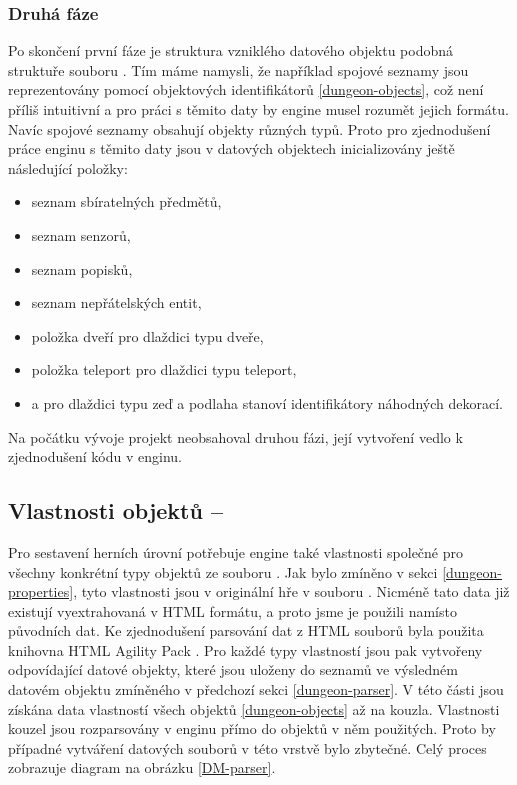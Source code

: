 \subsubsection{Druhá fáze}
Po skončení první fáze je struktura vzniklého datového objektu podobná struktuře souboru . Tím máme namysli, že
například spojové seznamy jsou reprezentovány pomocí objektových identifikátorů \vref{dungeon-objects}, což není příliš intuitivní a pro práci 
s těmito daty by engine musel rozumět jejich formátu. Navíc spojové seznamy obsahují objekty různých typů. Proto pro zjednodušení práce enginu
s těmito daty jsou v datových objektech inicializovány ještě následující položky: 
\begin{itemize} 
\item seznam sbíratelných předmětů,
\item seznam senzorů,
\item seznam popisků,
\item seznam nepřátelských entit,
\item položka dveří pro dlaždici typu dveře,
\item položka teleport pro dlaždici typu teleport,
\item a pro dlaždici typu zeď a podlaha stanoví identifikátory náhodných dekorací.
\end{itemize} 

Na počátku vývoje projekt neobsahoval druhou fázi, její vytvoření vedlo k zjednodušení kódu v enginu.

\subsection{Vlastnosti objektů -- }

Pro sestavení herních úrovní potřebuje engine také vlastnosti společné pro všechny konkrétní typy objektů ze
souboru . Jak bylo zmíněno v sekci \ref{dungeon-properties}, tyto vlastnosti jsou v originální hře v souboru .
Nicméně tato data již existují vyextrahovaná v HTML formátu, a proto jsme je použili namísto původních dat.
Ke zjednodušení parsování dat z HTML souborů byla
použita knihovna HTML Agility Pack \cite{HtmlAgilityPack}. Pro každé typy vlastností jsou pak vytvořeny odpovídající datové objekty,
které jsou uloženy do seznamů ve výsledném datovém objektu zmíněného v předchozí
sekci \ref{dungeon-parser}. V této části jsou získána data vlastností všech objektů \vref{dungeon-objects} až na kouzla.
Vlastnosti kouzel jsou rozparsovány v enginu přímo do objektů v něm použitých. Proto by případné vytváření datových souborů
v této vrstvě bylo zbytečné. Celý proces zobrazuje diagram na obrázku \ref{DM-parser}.

